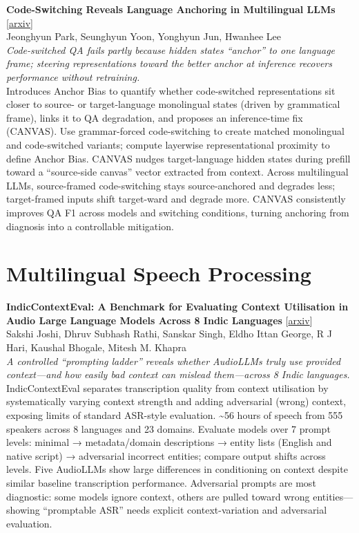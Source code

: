 \documentclass[12pt,letterpaper]{article}
\begin{document}
\medskip

{\small\textbf{Code-Switching Reveals Language Anchoring in Multilingual LLMs}} {\scriptsize[\href{https://arxiv.org/abs/2606.19668}{arxiv}]}\\
{\scriptsize Jeonghyun Park, Seunghyun Yoon, Yonghyun Jun, Hwanhee Lee}\\

{\small\textit{Code-switched QA fails partly because hidden states ``anchor'' to one language frame; steering representations toward the better anchor at inference recovers performance without retraining.}}\\[1pt]
{\footnotesize Introduces Anchor Bias to quantify whether code-switched representations sit closer to source- or target-language monolingual states (driven by grammatical frame), links it to QA degradation, and proposes an inference-time fix (CANVAS). Use grammar-forced code-switching to create matched monolingual and code-switched variants; compute layerwise representational proximity to define Anchor Bias. CANVAS nudges target-language hidden states during prefill toward a ``source-side canvas'' vector extracted from context. Across multilingual LLMs, source-framed code-switching stays source-anchored and degrades less; target-framed inputs shift target-ward and degrade more. CANVAS consistently improves QA F1 across models and switching conditions, turning anchoring from diagnosis into a controllable mitigation.}

\medskip


\section*{Multilingual Speech Processing}

{\small\textbf{IndicContextEval: A Benchmark for Evaluating Context Utilisation in Audio Large Language Models Across 8 Indic Languages}} {\scriptsize[\href{https://arxiv.org/abs/2606.19157}{arxiv}]}\\
{\scriptsize Sakshi Joshi, Dhruv Subhash Rathi, Sanskar Singh, Eldho Ittan George, R J Hari, Kaushal Bhogale, Mitesh M. Khapra}\\

{\small\textit{A controlled ``prompting ladder'' reveals whether AudioLLMs truly use provided context---and how easily bad context can mislead them---across 8 Indic languages.}}\\[1pt]
{\footnotesize IndicContextEval separates transcription quality from context utilisation by systematically varying context strength and adding adversarial (wrong) context, exposing limits of standard ASR-style evaluation. \textasciitilde{}56 hours of speech from 555 speakers across 8 languages and 23 domains. Evaluate models over 7 prompt levels: minimal → metadata/domain descriptions → entity lists (English and native script) → adversarial incorrect entities; compare output shifts across levels. Five AudioLLMs show large differences in conditioning on context despite similar baseline transcription performance. Adversarial prompts are most diagnostic: some models ignore context, others are pulled toward wrong entities---showing ``promptable ASR'' needs explicit context-variation and adversarial evaluation.}
\end{document}
